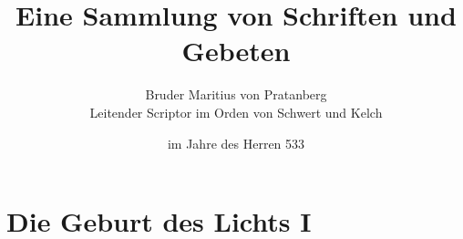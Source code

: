 \documentclass[10pt,twoside,BCOR=12mm,DIV=classic]{scrbook}
\begin{document}
\title{Eine Sammlung von Schriften und Gebeten}
\author{Bruder Maritius von Pratanberg\\Leitender Scriptor im Orden von Schwert und Kelch}
\date{im Jahre des Herren 533}

\maketitle
\tableofcontents
\chapter{Die Geburt des Lichts I}
\end{document}
